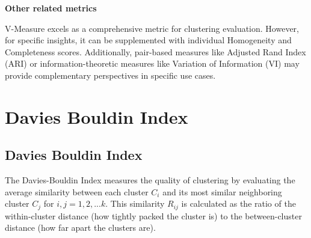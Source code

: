 \clearpage

\thispagestyle{customstyle}

\textbf{Other related metrics}

V-Measure excels as a comprehensive metric for clustering evaluation. However, for specific insights, it can be supplemented with
individual Homogeneity and Completeness scores. Additionally, pair-based measures like Adjusted Rand Index (ARI) or
information-theoretic measures like Variation of Information (VI) may provide complementary perspectives in specific use cases​.

\clearpage
\thispagestyle{clusteringstyle}
\section{Davies Bouldin Index}
\subsection{Davies Bouldin Index}

The Davies-Bouldin Index measures the quality of clustering by evaluating the average similarity between each cluster \( C_i \) and its most similar neighboring cluster 
\( C_j \) for $i,j = 1, 2, ... k$. This similarity \( R_{ij} \) is calculated as the ratio of the within-cluster distance (how tightly packed the cluster is) to the between-cluster distance (how far apart the clusters are).


\begin{center}

\end{center}


